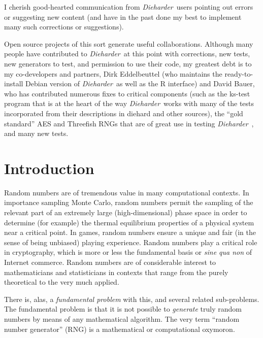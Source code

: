\documentclass[12pt]{book}
\newcommand{\die}{\emph{Dieharder}\ }
\begin{document}
I cherish good-hearted communication from \die users pointing out errors
or suggesting new content (and have in the past done my best to
implement many such corrections or suggestions).

Open source projects of this sort generate useful collaborations.
Although many people have contributed to \die at this point with
corrections, new tests, new generators to test, and permission to use
their code, my greatest debt is to my co-developers and partners, Dirk
Eddelbeuttel (who maintains the ready-to-install Debian version of
\die as well as the R interface) and David Bauer, who has
contributed numerous fixes to critical components (such as the ks-test
program that is at the heart of the way \die works with many of the
tests incorporated from their descriptions in diehard and other
sources), the ``gold standard'' AES and Threefish RNGs that are of great
use in testing \die, and many new tests.

\newpage

\tableofcontents

\newpage

\chapter{Introduction}

Random numbers are of tremendous value in many computational contexts.
In importance sampling Monte Carlo, random numbers permit the sampling
of the relevant part of an extremely large (high-dimensional) phase
space in order to determine (for example) the thermal equilibrium
properties of a physical system near a critical point.  In games, random
numbers ensure a unique and fair (in the sense of being unbiased)
playing experience.  Random numbers play a critical role in
cryptography, which is more or less the fundamental basis or {\em sine
qua non} of Internet commerce.  Random numbers are of considerable
interest to mathematicians and statisticians in contexts that range from
the purely theoretical to the very much applied.

There is, alas, a {\em fundamental problem} with this, and several
related sub-problems.  The fundamental problem is that it is not
possible to {\em generate} truly random numbers by means of any
mathematical algorithm.  The very term ``random number generator'' (RNG)
is a mathematical or computational oxymoron.  
\end{document}
